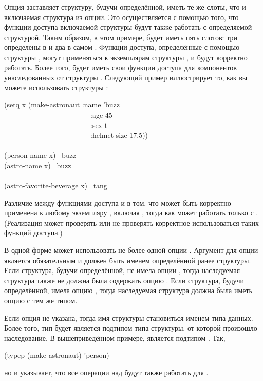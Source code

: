 \begin{flushdesc}
Опция  заставляет структуру, будучи определённой, иметь те же слоты,
что и включаемая структура из опции.
Это осуществляется с помощью того, что функции доступа включаемой структуры
будут также работать с определяемой структурой.
Таким образом, в этом примере,  будет иметь пять слотов: три
определены в  и два в самом .
Функции доступа, определённые с помощью структуры , могут применяться к
экземплярам структуры , и будут корректно работать.
Более того,  будет иметь свои функции доступа для компонентов
унаследованных от структуры .
Следующий пример иллюстрирует то, как вы можете использовать структуры
:
\begin{lisp}
(setq x (make-astronaut :name 'buzz \\
~~~~~~~~~~~~~~~~~~~~~~~~:age 45 \\
~~~~~~~~~~~~~~~~~~~~~~~~:sex t \\
~~~~~~~~~~~~~~~~~~~~~~~~:helmet-size 17.5)) \\
 \\
(person-name x) \EV\ buzz \\
(astro-name x) \EV\ buzz \\
\\
(astro-favorite-beverage x) \EV\ tang
\end{lisp}
Различие между функциями доступа  и  в том, что
 может быть корректно применена к любому экземпляру
, включая , тогда как  может работать
только с . (Реализация может проверять или не проверять
корректное использоваться таких функций доступа.)

В одной форме  может использовать не более одной опции
.
Аргумент для опции  является обязательным и должен быть именем
определённой ранее структуры. Если структура, будучи определённой, не имела
опции , тогда наследуемая структура также не должна была содержать
опцию .
Если структура, будучи определённой, имела опцию , тогда наследуемая
структура должна была иметь опцию  с тем же типом.

Если опция  не указана, тогда имя структуры становиться именем типа
данных. Более того, тип будет является подтипом типа структуры, от которой
произошло наследование. В вышеприведённом примере,  является
подтипом . Так,
\begin{lisp}
(typep (make-astronaut) 'person)
\end{lisp}
но и указывает, что все операции над  будут также работать для
.


\end{flushdesc}
